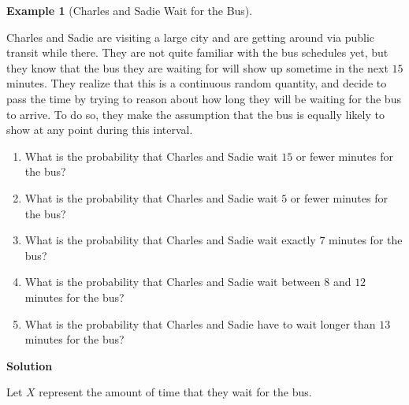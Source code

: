 \documentclass[
  letterpaper,
  DIV=11,
  numbers=noendperiod]{scrreprt}
\providecommand{\tightlist}{%
  \setlength{\itemsep}{0pt}\setlength{\parskip}{0pt}}\usepackage{longtable,booktabs,array}
\theoremstyle{definition}
\theoremstyle{definition}
\newtheorem{example}{Example}[chapter]
\theoremstyle{definition}
\theoremstyle{remark}
\begin{document}
\begin{example}[Charles and Sadie Wait for the
Bus]\protect\hypertarget{exm-charles-and-sadie-bus-times}{}\label{exm-charles-and-sadie-bus-times}

Charles and Sadie are visiting a large city and are getting around via
public transit while there. They are not quite familiar with the bus
schedules yet, but they know that the bus they are waiting for will show
up sometime in the next \(15\) minutes. They realize that this is a
continuous random quantity, and decide to pass the time by trying to
reason about how long they will be waiting for the bus to arrive. To do
so, they make the assumption that the bus is equally likely to show at
any point during this interval.

\begin{enumerate}
\def\labelenumi{\alph{enumi}.}
\tightlist
\item
  What is the probability that Charles and Sadie wait \(15\) or fewer
  minutes for the bus?
\item
  What is the probability that Charles and Sadie wait \(5\) or fewer
  minutes for the bus?
\item
  What is the probability that Charles and Sadie wait exactly \(7\)
  minutes for the bus?
\item
  What is the probability that Charles and Sadie wait between \(8\) and
  \(12\) minutes for the bus?
\item
  What is the probability that Charles and Sadie have to wait longer
  than \(13\) minutes for the bus?
\end{enumerate}

\begin{tcolorbox}[enhanced jigsaw, colback=white, colframe=quarto-callout-color-frame, arc=.35mm, leftrule=.75mm, rightrule=.15mm, opacityback=0, breakable, bottomrule=.15mm, left=2mm, toprule=.15mm]

\vspace{-3mm}\textbf{Solution}\vspace{3mm}

Let \(X\) represent the amount of time that they wait for the bus.


\end{tcolorbox}
\end{example}
\end{document}
